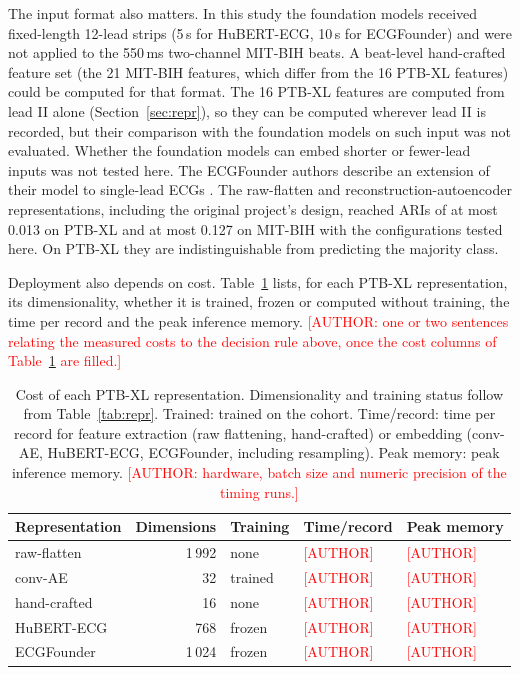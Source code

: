 \documentclass[preprint,11pt]{elsarticle}
\begin{document}
The input format also matters. In this study the foundation models received fixed-length
12-lead strips (5\,s for HuBERT-ECG, 10\,s for ECGFounder) and were not applied to the
550\,ms two-channel MIT-BIH beats. A beat-level hand-crafted feature set (the 21 MIT-BIH
features, which differ from the 16 PTB-XL features) could be computed for that format. The
16 PTB-XL features are computed from lead II alone (Section~\ref{sec:repr}), so they can be
computed wherever lead II is recorded, but their comparison with the foundation models on
such input was not evaluated. Whether the foundation models can embed shorter or
fewer-lead inputs was not tested here. The ECGFounder authors describe an extension of
their model to single-lead ECGs \cite{ecgfounder2024}. The raw-flatten and
reconstruction-autoencoder representations, including the original project's design,
reached ARIs of at most 0.013 on PTB-XL and at most 0.127 on MIT-BIH with the
configurations tested here. On PTB-XL they are indistinguishable from predicting the
majority class.

Deployment also depends on cost. Table~\ref{tab:cost} lists, for each PTB-XL
representation, its dimensionality, whether it is trained, frozen or computed without
training, the time per record and the peak inference memory. \textcolor{red}{[AUTHOR: one or two
sentences relating the measured costs to the decision rule above, once the cost columns of
Table~\ref{tab:cost} are filled.]}

\begin{table}[t]
\centering
\footnotesize
\caption{Cost of each PTB-XL representation. Dimensionality and training status follow
from Table~\ref{tab:repr}. Trained: trained on the cohort. Time/record: time per record
for feature extraction (raw flattening, hand-crafted) or embedding (conv-AE, HuBERT-ECG,
ECGFounder, including resampling). Peak memory: peak inference memory.
\textcolor{red}{[AUTHOR: hardware, batch size and numeric precision of the timing runs.]}}
\label{tab:cost}
\begin{tabular}{lrlll}
\toprule
Representation & Dimensions & Training & Time/record & Peak memory \\
\midrule
raw-flatten  & 1\,992 & none   & \textcolor{red}{[AUTHOR]} & \textcolor{red}{[AUTHOR]} \\
conv-AE      & 32     & trained & \textcolor{red}{[AUTHOR]} & \textcolor{red}{[AUTHOR]} \\
hand-crafted & 16     & none   & \textcolor{red}{[AUTHOR]} & \textcolor{red}{[AUTHOR]} \\
HuBERT-ECG   & 768    & frozen & \textcolor{red}{[AUTHOR]} & \textcolor{red}{[AUTHOR]} \\
ECGFounder   & 1\,024 & frozen & \textcolor{red}{[AUTHOR]} & \textcolor{red}{[AUTHOR]} \\
\bottomrule
\end{tabular}
\end{table}
\end{document}
